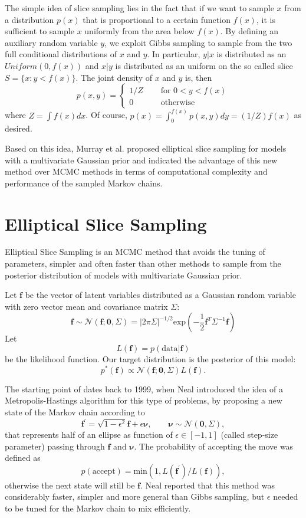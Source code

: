 \documentclass{article}
\begin{document}
The simple idea of slice sampling lies in the fact that if we want to sample $x$ from a distribution $p(x)$ that is proportional to a certain function $f(x)$, it is sufficient to sample $x$ uniformly from the area below $f(x)$.
By defining an auxiliary random variable $y$, we exploit Gibbs sampling to sample from the two full conditional distributions of $x$ and $y$. In particular, $y|x$ is distributed as an $Uniform(0,f(x))$ and $x|y$ is distributed as an uniform on the so called slice $S=\lbrace x: y<f(x)\rbrace$. The joint density of $x$ and $y$ is, then $$p(x,y)=\begin{cases}1/Z\quad&\text{ for }0<y<f(x)\\0\quad&\text{ otherwise}\end{cases}$$where $Z=\int f(x)dx$. Of course, $p(x)=\int_0^{f(x)} p(x,y)dy=(1/Z)f(x)$ as desired.

Based on this idea, Murray et al. \cite{MAM} proposed elliptical slice sampling for models with a multivariate Gaussian prior and indicated the advantage of this new method over MCMC methods in terms of computational complexity and performance of the sampled Markov chains.

\section{Elliptical Slice Sampling}

Elliptical Slice Sampling is an MCMC method that avoids the tuning of parameters, simpler and often faster than other methods to sample from the posterior distribution of models with multivariate Gaussian prior.

Let $\mathbf{f}$ be the vector of latent variables distributed as a Gaussian random variable with zero vector mean and covariance matrix $\Sigma$: $$\mathbf{f}\sim\mathcal{N}(\mathbf{f};\mathbf{0}, \Sigma)=|2\pi\Sigma|^{-1/2}\text{exp}\left(-\frac{1}{2}\mathbf{f}^T\Sigma^{-1}\mathbf{f}\right)$$ Let $$L(\mathbf{f})=p(\text{data}|\mathbf{f})$$ be the likelihood function. Our target distribution is the posterior of this model: $$p^*(\mathbf{f})\propto \mathcal{N}(\mathbf{f};\mathbf{0}, \Sigma)L(\mathbf{f}).$$

The starting point of \cite{MAM} dates back to 1999, when Neal \cite{Neal} introduced the idea of a Metropolis-Hastings algorithm for this type of problems, by proposing a new state of the Markov chain according to
$$\mathbf{f^{'}}=\sqrt{1-\epsilon^2}\mathbf{f}+\epsilon\pmb{\nu},\qquad\pmb{\nu}\sim\mathcal{N}(\mathbf{0}, \Sigma),$$ that represents half of an ellipse as function of $\epsilon\in[-1,1]$ (called step-size parameter) passing through $\mathbf{f}$ and $\pmb{\nu}$. %
The probability of accepting the move was defined as $$p(\text{accept})=\text{min}(1,L(\mathbf{f^'})/L(\mathbf{f})),$$ otherwise the next state will still be $\mathbf{f}$. Neal reported that this method was considerably faster, simpler and more general than Gibbs sampling, but $\epsilon$ needed to be tuned for the Markov chain to mix efficiently.
\end{document}
